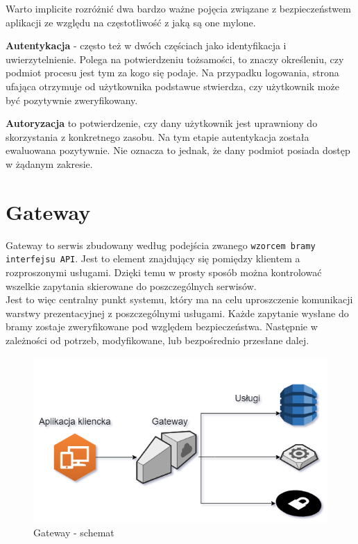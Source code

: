 Warto implicite rozróżnić dwa bardzo ważne pojęcia związane z bezpieczeństwem aplikacji ze względu na częstotliwość z jaką są one mylone.

\textbf{Autentykacja} - często też w dwóch częściach jako identyfikacja i uwierzytelnienie. Polega na potwierdzeniu tożsamości, to znaczy określeniu, czy podmiot procesu jest tym za kogo się podaje. Na przypadku logowania, strona ufająca otrzymuje od użytkownika podstawue stwierdza, czy użytkownik może być pozytywnie zweryfikowany.

\textbf{Autoryzacja} to potwierdzenie, czy dany użytkownik jest uprawniony do skorzystania z konkretnego zasobu. Na tym etapie autentykacja została ewaluowana pozytywnie. Nie oznacza to jednak, że dany podmiot posiada dostęp w żądanym zakresie. 

\section{Gateway}
Gateway to serwis zbudowany według podejścia zwanego \texttt{wzorcem bramy interfejsu API}\cite{richardson2018api}. Jest to element znajdujący się pomiędzy klientem a rozproszonymi usługami. Dzięki temu w prosty sposób można kontrolować wszelkie zapytania skierowane do poszczególnych serwisów.\\
Jest to więc centralny punkt systemu, który ma na celu uproszczenie komunikacji warstwy prezentacyjnej z poszczególnymi usługami. Każde zapytanie wysłane do bramy zostaje zweryfikowane pod względem bezpieczeństwa. Następnie w zależności od potrzeb, modyfikowane, lub bezpośrednio przesłane dalej.
\begin{figure}[H]
	\centering
	\includegraphics[width=\linewidth]{gateway.png}
	\caption{Gateway - schemat}
\end{figure}

